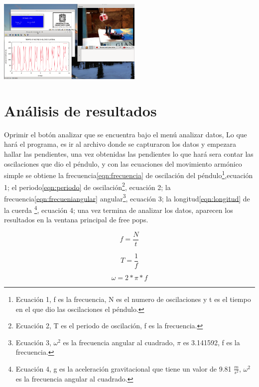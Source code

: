 \documentclass[12pt]{article}
\newenvironment{Figure}
{\par\medskip\noindent\minipage{\linewidth}}
{\endminipage\par\medskip}
\begin{document}
\begin{multicols}{2}
\begin{Figure}
\center
\includegraphics[width=9.cm, height=4cm]{fig/graf1.png}
\label{fig:g13}
\end{Figure}

\section{Análisis de resultados}
Oprimir el botón analizar que se encuentra bajo el menú analizar datos, Lo que hará el programa, es ir al archivo donde se capturaron los datos y empezara hallar las pendientes, una vez obtenidas las pendientes lo que hará sera contar las oscilaciones que dio el péndulo,  y con las ecuaciones\cite{GIANCOLI} del movimiento armónico simple se obtiene  la frecuencia\ref{eqn:frecuencia}  de oscilación del péndulo\footnote{ Ecuación 1, f es la frecuencia, N es el numero de oscilaciones y t es el tiempo en el que dio las oscilaciones el péndulo.},ecuación 1; el periodo\ref{eqn:periodo} de oscilación\footnote{Ecuación 2, T es el periodo de oscilación, f es la frecuencia.}, ecuación 2; la frecuencia\ref{eqn:frecueniangular} angular\footnote{ Ecuación 3, $\omega^2$ es la frecuencia angular al cuadrado, $\pi $ es 3.141592, f es la frecuencia.}, ecuación 3; la longitud\ref{eqn:longitud} de la cuerda \footnote{ Ecuación 4, g es la aceleración gravitacional que tiene un valor de 9.81 $\frac{m}{s^2}$, $\omega^2$ es la frecuencia angular al cuadrado.}, ecuación 4; una vez termina de analizar los datos, aparecen los resultados en la ventana principal de free pops.

\begin{equation}
\label{eqn:frecuencia}
f = \frac{N}{t}
\end{equation}

\begin{equation}
\label{eqn:periodo}
T = \frac{1}{f}
\end{equation}

\begin{equation}
\label{eqn:frecueniangular}
\omega = 2 * \pi * f
\end{equation}


\end{multicols}
\end{document}
